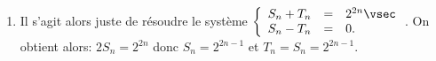 \begin{correction}
\begin{enumerate}

\item Il s'agit alors juste de r\'esoudre le syst\`{e}me $\left\lbrace \begin{array}{lll}  S_n+T_n&=&2^{2n}\vsec \\ S_n-T_n&=& 0. \end{array}\right.$. On obtient alors: $2S_n=2^{2n}$  donc $S_n= 2^{2n-1}$ et $T_n=S_n=2^{2n-1}$.
\end{enumerate}
\end{correction}